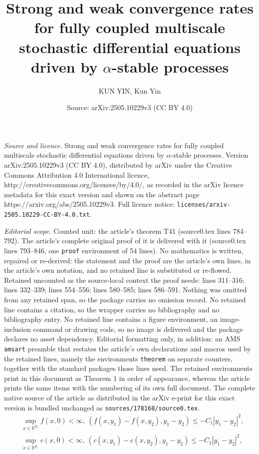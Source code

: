 \documentclass[10pt,a4paper]{amsart}
\title{Strong and weak convergence rates for fully coupled multiscale stochastic differential equations driven by $\alpha$-stable processes}
\author{KUN YIN, Kun Yin}
\date{Source: arXiv:2505.10229v3 (CC BY 4.0)}
\begin{document}
\maketitle

\noindent\emph{Source and licence.} Strong and weak convergence rates for fully coupled multiscale stochastic differential equations driven by $\alpha$-stable processes. Version arXiv:2505.10229v3 (CC BY 4.0), distributed by arXiv under the Creative Commons Attribution 4.0 International licence, http://creativecommons.org/licenses/by/4.0/, as recorded in the arXiv licence metadata for this exact version and shown on the abstract page https://arxiv.org/abs/2505.10229v3. Full licence notice: \texttt{licenses/arxiv-2505.10229-CC-BY-4.0.txt}.\par\smallskip

\noindent\textit{Editorial scope.} Counted unit: the article's theorem T41 (source0.tex lines 784--792). The article's complete original proof of it is delivered with it (source0.tex lines 793--846, one \texttt{proof} environment of 54 lines). No mathematics is written, repaired or re-derived: the statement and the proof are the article's own lines, in the article's own notation, and no retained line is substituted or re-flowed.  Retained uncounted as the source-local context the proof needs: lines 311--316; lines 332--339; lines 554--556; lines 580--585; lines 586--591.  Nothing was omitted from any retained span, so the package carries no omission record.  No retained line contains a citation, so the wrapper carries no bibliography and no bibliography entry.  No retained line contains a figure environment, an image-inclusion command or drawing code, so no image is delivered and the package declares no asset dependency.  Editorial formatting only, in addition: an AMS \texttt{amsart} preamble that restates the article's own declarations and macros used by the retained lines, namely the environments \texttt{theorem} on separate counters, together with the standard packages those lines need.  The retained environments print in this document as Theorem 1 in order of appearance, whereas the article prints the same items with the numbering of its own full document.  The complete native source of the article as distributed in the arXiv e-print for this exact version is bundled unchanged as \texttt{sources/178168/source0.tex}.
\begin{equation}\label{2.2}
	\begin{split}
		& \sup_{x\in \mathbb{R}^{d_{1}}}f(x,0)<\infty, \ ( f(x,y_{1})-f(x,y_{2}), y_{1}-y_{2})  \leq -C_{1}|y_{1}-y_{2}|^{2},\\
		& \sup_{x\in \mathbb{R}^{d_{1}}}c(x,0)<\infty, \ ( c(x,y_{1})-c(x,y_{2}), y_{1}-y_{2})  \leq -C_{1}|y_{1}-y_{2}|^{2},
			\end{split}
	\end{equation}
\end{document}
